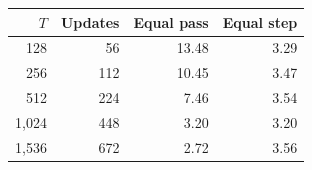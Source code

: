 \begin{tabular}{rrrr}\toprule
$T$&Updates&Equal pass&Equal step\\
\midrule
128 & 56 & 13.48 & 3.29 \\
256 & 112 & 10.45 & 3.47 \\
512 & 224 & 7.46 & 3.54 \\
1,024 & 448 & 3.20 & 3.20 \\
1,536 & 672 & 2.72 & 3.56 \\
\bottomrule\end{tabular}
